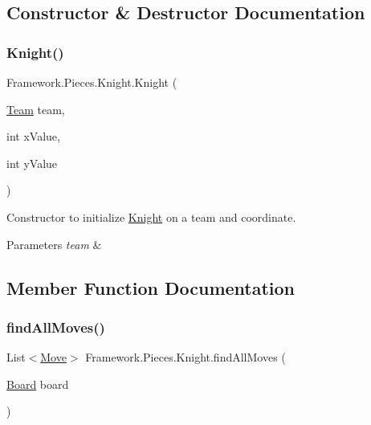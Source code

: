 \subsection{Constructor \& Destructor Documentation}
\hypertarget{class_framework_1_1_pieces_1_1_knight_ac232462b30d8b736259c7f552436468b}{}\label{class_framework_1_1_pieces_1_1_knight_ac232462b30d8b736259c7f552436468b} 
\subsubsection{\texorpdfstring{Knight()}{Knight()}}
{\footnotesize\ttfamily Framework.\+Pieces.\+Knight.\+Knight (\begin{DoxyParamCaption}\item[{\hyperlink{class_framework_1_1_team}{Team}}]{team,  }\item[{int}]{x\+Value,  }\item[{int}]{y\+Value }\end{DoxyParamCaption})}

Constructor to initialize \hyperlink{class_framework_1_1_pieces_1_1_knight}{Knight} on a team and coordinate. 
\begin{DoxyParams}{Parameters}
{\em team} & \\
\hline
\end{DoxyParams}


\subsection{Member Function Documentation}
\hypertarget{class_framework_1_1_pieces_1_1_knight_a0c01ddd9a78ca639d5ee87dc28ef5584}{}\label{class_framework_1_1_pieces_1_1_knight_a0c01ddd9a78ca639d5ee87dc28ef5584} 
\subsubsection{\texorpdfstring{find\+All\+Moves()}{findAllMoves()}}
{\footnotesize\ttfamily List$<$\hyperlink{class_framework_1_1_move}{Move}$>$ Framework.\+Pieces.\+Knight.\+find\+All\+Moves (\begin{DoxyParamCaption}\item[{\hyperlink{class_framework_1_1_board}{Board}}]{board }\end{DoxyParamCaption})}

